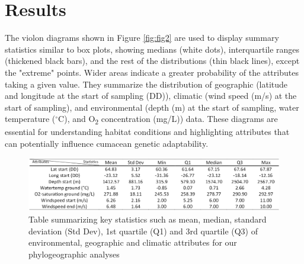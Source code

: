 \section{Results}\label{results}
The violon diagrams shown in Figure \ref{fig:fig2} are used to display summary statistics similar to box plots, showing medians (white dots), interquartile ranges (thickened black bars), and the rest of the distributions (thin black lines), except the "extreme" points. Wider areas indicate a greater probability of the attributes taking a given value. They summarize the distribution of geographic (latitude and longitude at the start of sampling (DD)), climatic (wind speed (m/s) at the start of sampling), and environmental (depth (m) at the start of sampling, water temperature ($^\circ$C), and O\textsubscript{2} concentration (mg/L)) data. These diagrams are essential for understanding habitat conditions and highlighting attributes that can potentially influence cumacean genetic adaptability. 

\begin{figure}[H]
    \centering
    \includegraphics[width=\textwidth]{Table_Attributes_Data.png}
    \caption{Table summarizing key statistics such as mean, median, standard deviation (Std Dev), 1st quartile (Q1) and 3rd quartile (Q3) of environmental, geographic and        climatic attributes for our phylogeographic analyses} \label{fig:tab1}
    \end{figure}

